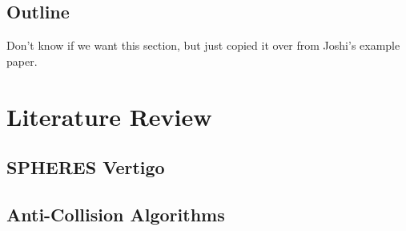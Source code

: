 \documentclass[journal, 10pt]{IEEEtran}
\begin{document}
\subsection{Outline}
Don't know if we want this section, but just copied it over from Joshi's example paper.


%


\section{Literature Review}
\subsection{SPHERES Vertigo}

\subsection{Anti-Collision Algorithms}
\end{document}
